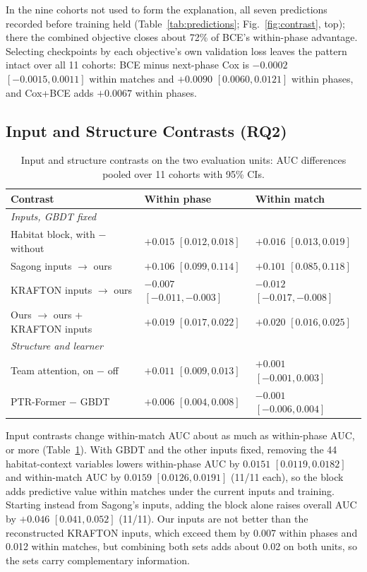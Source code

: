 \documentclass[sigconf,anonymous,nonacm]{acmart}
\begin{document}

In the nine cohorts not used to form the explanation, all seven predictions recorded before training held (Table~\ref{tab:predictions}; Fig.~\ref{fig:contrast}, top); there the combined objective closes about 72\% of BCE's within-phase advantage. Selecting checkpoints by each objective's own validation loss leaves the pattern intact over all 11 cohorts: BCE minus next-phase Cox is $-0.0002$ $[-0.0015,\allowbreak 0.0011]$ within matches and $+0.0090$ $[0.0060,\allowbreak 0.0121]$ within phases, and Cox+BCE adds $+0.0067$ within phases.

\subsection{Input and Structure Contrasts (RQ2)}
\label{sec:results:inputs}
\begin{table}[t]
\centering\scriptsize
\caption{Input and structure contrasts on the two evaluation units: AUC differences pooled over 11 cohorts with 95\% CIs.}
\label{tab:contrasts}
\setlength{\tabcolsep}{2.5pt}
\begin{tabular}{lll}
\toprule
Contrast & Within phase & Within match \\
\midrule
\multicolumn{3}{l}{\emph{Inputs, GBDT fixed}} \\
Habitat block, with $-$ without & $+0.015$ $[0.012, 0.018]$ & $+0.016$ $[0.013, 0.019]$ \\
Sagong inputs $\to$ ours & $+0.106$ $[0.099, 0.114]$ & $+0.101$ $[0.085, 0.118]$ \\
KRAFTON inputs $\to$ ours & $-0.007$ $[-0.011, -0.003]$ & $-0.012$ $[-0.017, -0.008]$ \\
Ours $\to$ ours + KRAFTON inputs & $+0.019$ $[0.017, 0.022]$ & $+0.020$ $[0.016, 0.025]$ \\
\midrule
\multicolumn{3}{l}{\emph{Structure and learner}} \\
Team attention, on $-$ off & $+0.011$ $[0.009, 0.013]$ & $+0.001$ $[-0.001, 0.003]$ \\
PTR-Former $-$ GBDT & $+0.006$ $[0.004, 0.008]$ & $-0.001$ $[-0.006, 0.004]$ \\
\bottomrule
\end{tabular}
\end{table}
Input contrasts change within-match AUC about as much as within-phase AUC, or more (Table~\ref{tab:contrasts}). With GBDT and the other inputs fixed, removing the 44 habitat-context variables lowers within-phase AUC by $0.0151$ $[0.0119,\allowbreak 0.0182]$ and within-match AUC by $0.0159$ $[0.0126,\allowbreak 0.0191]$ (11/11 each), so the block adds predictive value within matches under the current inputs and training. Starting instead from Sagong's inputs, adding the block alone raises overall AUC by $+0.046$ $[0.041,\allowbreak 0.052]$ (11/11). Our inputs are not better than the reconstructed KRAFTON inputs, which exceed them by 0.007 within phases and 0.012 within matches, but combining both sets adds about 0.02 on both units, so the sets carry complementary information.
\end{document}

